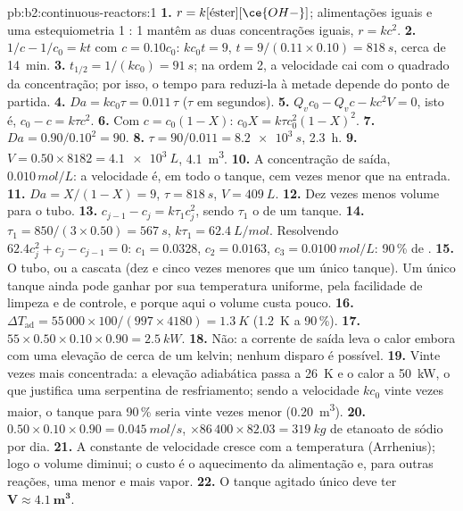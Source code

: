\begin{solution}{pb:b2:continuous-reactors:1}
\textbf{1.} $r = k[\text{éster}][\ce{OH-}]$; alimentações iguais e uma
estequiometria 1 : 1 mantêm as duas concentrações iguais, $r = kc^2$.
\textbf{2.} $1/c - 1/c_0 = kt$ com $c = 0.10c_0$: $kc_0t = 9$, $t = 9/(0.11
\times 0.10) = \qty{818}{s}$, cerca de \qty{14}{min}.
\textbf{3.} $t_{1/2} = 1/(kc_0) = \qty{91}{s}$; na ordem 2, a velocidade cai
com o quadrado da concentração; por isso, o tempo para reduzi-la à metade
depende do ponto de partida.
\textbf{4.} $Da = kc_0\tau = 0.011\,\tau$ ($\tau$ em segundos).
\textbf{5.} $Q_vc_0 - Q_vc - kc^2V = 0$, isto é, $c_0 - c = k\tau c^2$.
\textbf{6.} Com $c = c_0(1 - X)$: $c_0X = k\tau c_0^2(1 - X)^2$.
\textbf{7.} $Da = 0.90/0.10^2 = 90$.
\textbf{8.} $\tau = 90/0.011 = \qty{8.2e3}{s}$, \qty{2.3}{h}.
\textbf{9.} $V = 0.50 \times 8182 = \qty{4.1e3}{L}$, \qty{4.1}{m^3}.
\textbf{10.} A concentração de saída, $0.010\,\unit{mol/L}$: a velocidade é,
em todo o tanque, cem vezes menor que na entrada.
\textbf{11.} $Da = X/(1 - X) = 9$, $\tau = \qty{818}{s}$, $V = \qty{409}{L}$.
\textbf{12.} Dez vezes menos volume para o tubo.
\textbf{13.} $c_{j-1} - c_j = k\tau_1c_j^2$, sendo $\tau_1$ o 
de um tanque.
\textbf{14.} $\tau_1 = 850/(3 \times 0.50) = \qty{567}{s}$, $k\tau_1 =
\qty{62.4}{L/mol}$. Resolvendo $62.4c_j^2 + c_j - c_{j-1} = 0$: $c_1 = 0.0328$,
$c_2 = 0.0163$, $c_3 = \qty{0.0100}{mol/L}$: 90\,\% de .
\textbf{15.} O tubo, ou a cascata (dez e cinco vezes menores que um único
tanque). Um único tanque ainda pode ganhar por sua temperatura uniforme, pela
facilidade de limpeza e de controle, e porque aqui o volume custa pouco.
\textbf{16.} $\Delta T_{\text{ad}} = 55\,000 \times 100/(997 \times 4180) =
\qty{1.3}{K}$ (\qty{1.2}{K} a 90\,\%).
\textbf{17.} $55 \times 0.50 \times 0.10 \times 0.90 = \qty{2.5}{kW}$.
\textbf{18.} Não: a corrente de saída leva o calor embora com uma elevação de
cerca de um kelvin; nenhum disparo é possível.
\textbf{19.} Vinte vezes mais concentrada: a elevação adiabática passa a
\qty{26}{K} e o calor a \qty{50}{kW}, o que justifica uma serpentina de
resfriamento; sendo a velocidade $kc_0$ vinte vezes maior, o tanque para
90\,\% seria vinte vezes menor (\qty{0.20}{m^3}).
\textbf{20.} $0.50 \times 0.10 \times 0.90 = \qty{0.045}{mol/s}$, $\times 86\,400
\times 82.03 = \qty{319}{kg}$ de etanoato de sódio por dia.
\textbf{21.} A constante de velocidade cresce com a temperatura (Arrhenius);
logo o volume diminui; o custo é o aquecimento da alimentação e, para outras
reações, uma  menor e mais vapor.
\textbf{22.} O tanque agitado único deve ter $\boldsymbol{V \approx
\qty{4.1}{m^3}}$.
\end{solution}
